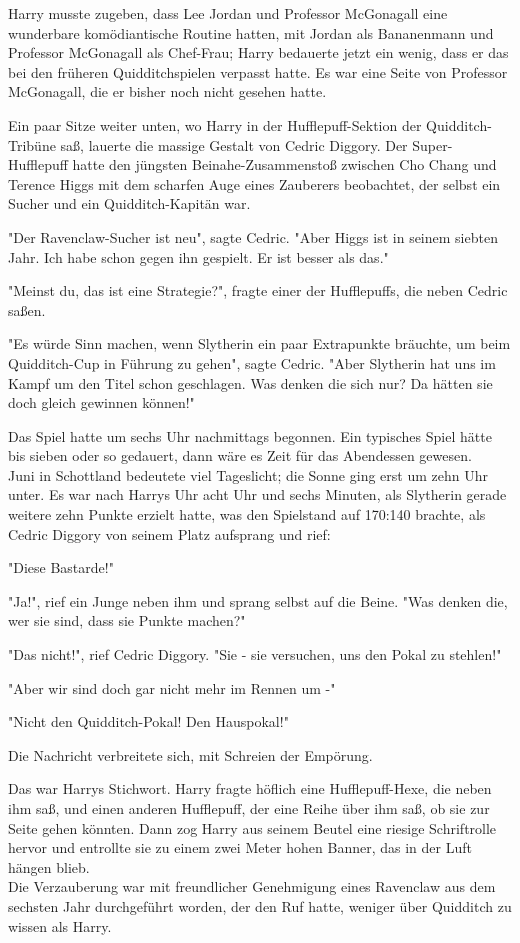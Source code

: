 {Harry musste zugeben, dass Lee Jordan und Professor McGonagall eine wunderbare komödiantische Routine hatten, mit Jordan als Bananenmann und Professor McGonagall als Chef-Frau; Harry bedauerte jetzt ein wenig, dass er das bei den früheren Quidditchspielen verpasst hatte. Es war eine Seite von Professor McGonagall, die er bisher noch nicht gesehen hatte.

Ein paar Sitze weiter unten, wo Harry in der Hufflepuff-Sektion der Quidditch-Tribüne saß, lauerte die massige Gestalt von Cedric Diggory. Der Super-Hufflepuff hatte den jüngsten Beinahe-Zusammenstoß zwischen Cho Chang und Terence Higgs mit dem scharfen Auge eines Zauberers beobachtet, der selbst ein Sucher und ein Quidditch-Kapitän war.

"Der Ravenclaw-Sucher ist neu", sagte Cedric. "Aber Higgs ist in seinem siebten Jahr. Ich habe schon gegen ihn gespielt. Er ist besser als das."

"Meinst du, das ist eine Strategie?", fragte einer der Hufflepuffs, die neben Cedric saßen.

"Es würde Sinn machen, wenn Slytherin ein paar Extrapunkte bräuchte, um beim Quidditch-Cup in Führung zu gehen", sagte Cedric. "Aber Slytherin hat uns im Kampf um den Titel schon geschlagen. Was denken die sich nur? Da hätten sie doch gleich gewinnen können!"

Das Spiel hatte um sechs Uhr nachmittags begonnen. Ein typisches Spiel hätte bis sieben oder so gedauert, dann wäre es Zeit für das Abendessen gewesen.\\ Juni in Schottland bedeutete viel Tageslicht; die Sonne ging erst um zehn Uhr unter. Es war nach Harrys Uhr acht Uhr und sechs Minuten, als Slytherin gerade weitere zehn Punkte erzielt hatte, was den Spielstand auf 170:140 brachte, als Cedric Diggory von seinem Platz aufsprang und rief:

"Diese Bastarde!"

"Ja!", rief ein Junge neben ihm und sprang selbst auf die Beine. "Was denken die, wer sie sind, dass sie Punkte machen?"

"Das nicht!", rief Cedric Diggory. "Sie - sie versuchen, uns den Pokal zu stehlen!"

"Aber wir sind doch gar nicht mehr im Rennen um -"

"Nicht den Quidditch-Pokal! Den Hauspokal!"

Die Nachricht verbreitete sich, mit Schreien der Empörung.

Das war Harrys Stichwort. Harry fragte höflich eine Hufflepuff-Hexe, die neben ihm saß, und einen anderen Hufflepuff, der eine Reihe über ihm saß, ob sie zur Seite gehen könnten. Dann zog Harry aus seinem Beutel eine riesige Schriftrolle hervor und entrollte sie zu einem zwei Meter hohen Banner, das in der Luft hängen blieb.\\ Die Verzauberung war mit freundlicher Genehmigung eines Ravenclaw aus dem sechsten Jahr durchgeführt worden, der den Ruf hatte, weniger über Quidditch zu wissen als Harry.

}
